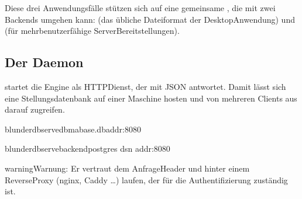 \documentclass[letterpaper,10pt,german]{sphinxmanual}
\begin{document}
\sphinxAtStartPar
Diese drei Anwendungsfälle stützen sich auf eine gemeinsame , die mit zwei Backends umgehen kann:  (das übliche \sphinxhyphen{}Dateiformat der Desktop\sphinxhyphen{}Anwendung) und  (für mehrbenutzerfähige Server\sphinxhyphen{}Bereitstellungen).


\subsection{Der Daemon }
\label{\detokenize{mode_headless:le-demon-serve}}\label{\detokenize{mode_headless:headless-serve}}
\sphinxAtStartPar
{} startet die Engine als HTTP\sphinxhyphen{}Dienst, der mit JSON antwortet. Damit lässt sich eine Stellungsdatenbank auf einer Maschine hosten und von mehreren Clients aus darauf zugreifen.

\begin{sphinxVerbatim}[commandchars=\\\{\}]
blunderdbserve\PYGZhy{}\PYGZhy{}dbma\PYGZus{}base.db\PYGZhy{}\PYGZhy{}addr:8080

blunderdbserve\PYGZhy{}\PYGZhy{}backendpostgres
\PYGZhy{}\PYGZhy{}dsn
\PYGZhy{}\PYGZhy{}addr:8080
\end{sphinxVerbatim}

\begin{sphinxadmonition}{warning}{Warnung:}
\sphinxAtStartPar
{} Er vertraut dem Anfrage\sphinxhyphen{}Header  und  hinter einem Reverse\sphinxhyphen{}Proxy (nginx, Caddy …) laufen, der für die Authentifizierung zuständig ist. 
\end{sphinxadmonition}

\sphinxAtStartPar
{}
\end{document}
